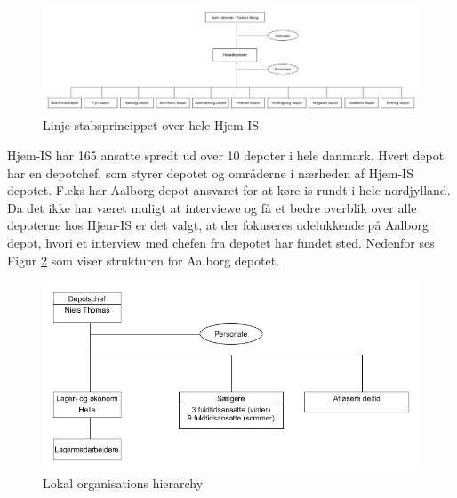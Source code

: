 \begin{landscape}
    \begin{figure}[p]
        \centering
        \includegraphics[width=\hsize]{figures/businesscase/global_hierarchy.png}
        \caption{Linje-stabsprincippet over hele Hjem-IS}
        \label{fig:global_hierarchy}
    \end{figure}        
\end{landscape}

Hjem-IS har 165 ansatte spredt ud over 10 depoter i hele danmark. Hvert depot har en depotchef, som styrer depotet og områderne i nærheden af Hjem-IS depotet. F.eks har Aalborg depot ansvaret for at køre is rundt i hele nordjylland. Da det ikke har været muligt at interviewe og få et bedre overblik over alle depoterne hos Hjem-IS er det valgt, at der fokuseres udelukkende på Aalborg depot, hvori et interview med chefen fra depotet har fundet sted. Nedenfor ses Figur \ref{fig:local_hierarchy} som viser strukturen for Aalborg depotet. 

\begin{figure}[H]
    \centering
    \includegraphics[width=\textwidth]{figures/businesscase/local_hierarchy.png}
    \caption{Lokal organisations hierarchy}
    \label{fig:local_hierarchy}
\end{figure}

